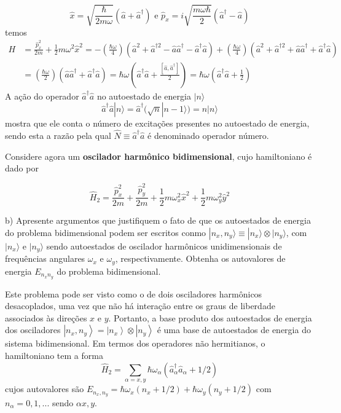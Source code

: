 \begin{enumerate}[start=1,label={\bfseries Q\arabic*.}]
$$
\hat{x}=\sqrt{\frac{\hbar}{2 m \omega}}\left(\hat{a}+\hat{a}^{\dagger}\right) \text { e } \hat{p}_{x}=i \sqrt{\frac{m \omega \hbar}{2}}\left(\hat{a}^{\dagger}-\hat{a}\right)
$$
temos
$$
\begin{aligned}
H &=\frac{\hat{p}_{x}^{2}}{2 m}+\frac{1}{2} m \omega^{2} \hat{x}^{2}=-\left(\frac{\hbar \omega}{4}\right)\left(\hat{a}^{2}+\hat{a}^{\dagger 2}-\hat{a} \hat{a}^{\dagger}-\hat{a}^{\dagger} \hat{a}\right)+\left(\frac{\hbar \omega}{4}\right)\left(\hat{a}^{2}+\hat{a}^{\dagger 2}+\hat{a} \hat{a}^{\dagger}+\hat{a}^{\dagger} \hat{a}\right) \\
&=\left(\frac{\hbar \omega}{2}\right)\left(\hat{a} \hat{a}^{\dagger}+\hat{a}^{\dagger} \hat{a}\right)=\hbar \omega\left(\hat{a}^{\dagger} \hat{a}+\frac{\left[\hat{a}, \hat{a}^{\dagger}\right]}{2}\right)=\hbar \omega\left(\hat{a}^{\dagger} \hat{a}+\frac{1}{2}\right)
\end{aligned}
$$
A ação do operador $\hat{a}^{\dagger}\hat{a}$ no autoestado de energia $|n\rangle$
$$
\hat{a}^{\dagger} \hat{a}|n\rangle=\hat{a}^{\dagger}(\sqrt{n}|n-1\rangle)=n|n\rangle
$$
mostra que ele conta o número de excitações presentes no autoestado de energia, sendo esta a razão pela qual $\hat{N} \equiv \hat{a}^{\dagger} \hat{a}$ é denominado operador número.


Considere agora um \textbf{oscilador harmônico bidimensional}, cujo hamiltoniano é dado por

$$
 \hat{H}_{2} = \frac{\hat{p}_{x}^{2}}{2m} + \frac{\hat{p}_{y}^{2}}{2m} + \frac{1}{2}m \omega_{x}^{2} \hat{x}^{2} + \frac{1}{2}m \omega_{y}^{2} \hat{y}^{2}
$$

b) Apresente argumentos que justifiquem o fato de que os autoestados de energia do problema bidimensional podem ser escritos conmo $|n_{x}, n_{y} \rangle \equiv |n_{x}\rangle \otimes |n_{y} \rangle$, com $|n_{x}\rangle$ e $|n_{y} \rangle$ sendo autoestados de oscilador harmônicos unidimensionais de frequências angulares $\omega_{x}$ e $\omega_{y}$, respectivamente. Obtenha os autovalores de energia $E_{n_{x}n_{y}}$ do problema bidimensional.

\resposta Este problema pode ser visto como o de dois osciladores harmônicos desacoplados, uma vez que não há interação entre os graus de liberdade associados às direções $x$ e $y$. Portanto, a base produto dos autoestados de energia dos osciladores $\left|n_{x}, n_{y}\right\rangle=\left|n_{x}\right\rangle \otimes\left|n_{y}\right\rangle$ é uma base de autoestados de energia do sistema bidimensional. Em termos dos operadores não hermitianos, o hamiltoniano tem a forma
$$
\hat{H}_{2}=\sum_{\alpha=x, y} \hbar \omega_{\alpha}\left(\hat{a}_{\alpha}^{\dagger} \hat{a}_{\alpha}+1 / 2\right)
$$
cujos autovalores são $E_{n_{x}, n_{y}}=\hbar \omega_{x}\left(n_{x}+1 / 2\right)+\hbar \omega_{y}\left(n_{y}+1 / 2\right)$ com $n_{\alpha} = 0,1,...$ sendo $\alpha x, y$.




\end{enumerate}
